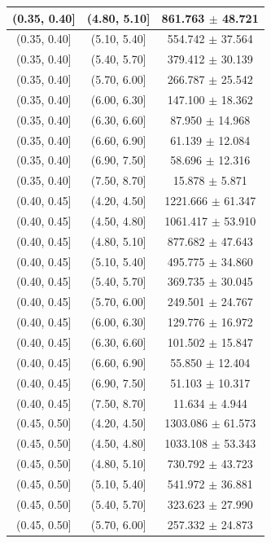 \begin{longtable}{|c|c|c|}
\hline
(0.35, 0.40] & (4.80, 5.10] & 861.763 $\pm$ 48.721 \\ 
\hline
(0.35, 0.40] & (5.10, 5.40] & 554.742 $\pm$ 37.564 \\ 
\hline
(0.35, 0.40] & (5.40, 5.70] & 379.412 $\pm$ 30.139 \\ 
\hline
(0.35, 0.40] & (5.70, 6.00] & 266.787 $\pm$ 25.542 \\ 
\hline
(0.35, 0.40] & (6.00, 6.30] & 147.100 $\pm$ 18.362 \\ 
\hline
(0.35, 0.40] & (6.30, 6.60] & 87.950 $\pm$ 14.968 \\ 
\hline
(0.35, 0.40] & (6.60, 6.90] & 61.139 $\pm$ 12.084 \\ 
\hline
(0.35, 0.40] & (6.90, 7.50] & 58.696 $\pm$ 12.316 \\ 
\hline
(0.35, 0.40] & (7.50, 8.70] & 15.878 $\pm$ 5.871 \\ 
\hline
(0.40, 0.45] & (4.20, 4.50] & 1221.666 $\pm$ 61.347 \\ 
\hline
(0.40, 0.45] & (4.50, 4.80] & 1061.417 $\pm$ 53.910 \\ 
\hline
(0.40, 0.45] & (4.80, 5.10] & 877.682 $\pm$ 47.643 \\ 
\hline
(0.40, 0.45] & (5.10, 5.40] & 495.775 $\pm$ 34.860 \\ 
\hline
(0.40, 0.45] & (5.40, 5.70] & 369.735 $\pm$ 30.045 \\ 
\hline
(0.40, 0.45] & (5.70, 6.00] & 249.501 $\pm$ 24.767 \\ 
\hline
(0.40, 0.45] & (6.00, 6.30] & 129.776 $\pm$ 16.972 \\ 
\hline
(0.40, 0.45] & (6.30, 6.60] & 101.502 $\pm$ 15.847 \\ 
\hline
(0.40, 0.45] & (6.60, 6.90] & 55.850 $\pm$ 12.404 \\ 
\hline
(0.40, 0.45] & (6.90, 7.50] & 51.103 $\pm$ 10.317 \\ 
\hline
(0.40, 0.45] & (7.50, 8.70] & 11.634 $\pm$ 4.944 \\ 
\hline
(0.45, 0.50] & (4.20, 4.50] & 1303.086 $\pm$ 61.573 \\ 
\hline
(0.45, 0.50] & (4.50, 4.80] & 1033.108 $\pm$ 53.343 \\ 
\hline
(0.45, 0.50] & (4.80, 5.10] & 730.792 $\pm$ 43.723 \\ 
\hline
(0.45, 0.50] & (5.10, 5.40] & 541.972 $\pm$ 36.881 \\ 
\hline
(0.45, 0.50] & (5.40, 5.70] & 323.623 $\pm$ 27.990 \\ 
\hline
(0.45, 0.50] & (5.70, 6.00] & 257.332 $\pm$ 24.873 \\ 

\end{longtable}

